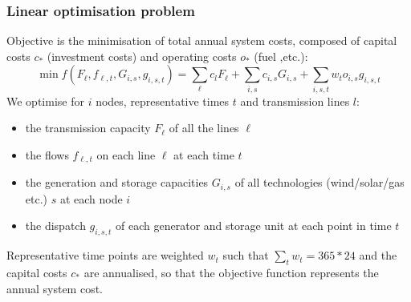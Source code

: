 \documentclass[10pt,aspectratio=169,dvipsnames]{beamer}
\let\olditem\item
\renewcommand{\item}{%
\olditem\vspace{5pt}}
\begin{document}
\begin{frame}
  \frametitle{Linear optimisation problem}


  Objective is the minimisation of \alert{total annual system costs}, composed of \alert{capital costs} $c_*$ (investment costs) and \alert{operating costs} $o_*$ (fuel ,etc.):
  \begin{equation*}
\min    f(F_\ell, f_{\ell,t}, G_{i,s},  g_{i,s,t}) =  \sum_{\ell} c_l F_\ell + \sum_{i,s} c_{i,s} G_{i,s} + \sum_{i,s,t} w_t o_{i,s} g_{i,s,t}
  \end{equation*}
  We optimise for $i$ nodes, representative times $t$ and transmission lines $l$:
  \begin{itemize}
  \item the transmission capacity $F_\ell$ of all the lines $\ell$
  \item the flows $f_{\ell,t}$ on each line $\ell$ at each time $t$
  \item the generation and storage capacities $G_{i,s}$ of all technologies (wind/solar/gas etc.) $s$ at each node $i$
  \item the dispatch $g_{i,s,t}$ of each generator and storage unit at each point in time $t$
  \end{itemize}

  Representative time points are weighted $w_t$ such that $\sum_t w_t = 365*24$ and the capital costs $c_*$ are annualised, so that the objective function represents the annual system cost.

\end{frame}
\end{document}
